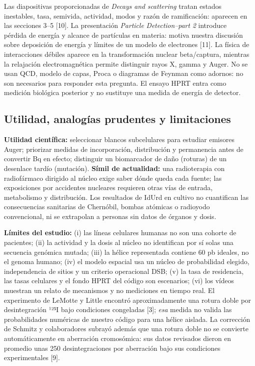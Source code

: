 \documentclass[11pt,a4paper,oneside]{article}
\begin{document}
Las diapositivas proporcionadas de \emph{Decays and scattering} tratan estados inestables, tasa, semivida, actividad, modos y razón de ramificación: aparecen en las secciones 3--5 {[}10{]}. La presentación \emph{Particle Detection--part 2} introduce pérdida de energía y alcance de partículas en materia: motiva nuestra discusión sobre deposición de energía y límites de un modelo de electrones {[}11{]}. La física de interacciones débiles aparece en la transformación nuclear beta/captura, mientras la relajación electromagnética permite distinguir rayos X, gamma y Auger. No se usan QCD, modelo de capas, Proca o diagramas de Feynman como adornos: no son necesarios para responder esta pregunta. El ensayo HPRT entra como medición biológica posterior y no sustituye una medida de energía de detector.

\subsection{Utilidad, analogías prudentes y limitaciones}\label{utilidad-analoguxedas-prudentes-y-limitaciones}

\textbf{Utilidad científica:} seleccionar blancos subcelulares para estudiar emisores Auger; priorizar medidas de incorporación, distribución y permanencia antes de convertir Bq en efecto; distinguir un biomarcador de daño (roturas) de un desenlace tardío (mutación). \textbf{Símil de actualidad:} una radioterapia con radiofármaco dirigido al núcleo exige saber dónde queda cada fuente; las exposiciones por accidentes nucleares requieren otras vías de entrada, metabolismo y distribución. Los resultados de IdUrd en cultivo no cuantifican las consecuencias sanitarias de Chernóbil, bombas atómicas o radioyodo convencional, ni se extrapolan a personas sin datos de órganos y dosis.

\textbf{Límites del estudio:} (i) las líneas celulares humanas no son una cohorte de pacientes; (ii) la actividad y la dosis al núcleo no identifican por sí solas una secuencia genómica mutada; (iii) la hélice representada contiene 60 pb ideales, no el genoma humano; (iv) el modelo espacial usa un núcleo de probabilidad elegido, independencia de sitios y un criterio operacional DSB; (v) la tasa de residencia, las tasas celulares y el fondo HPRT del código son escenarios; (vi) los vídeos muestran un relato de mecanismos y no mediciones en tiempo real. El experimento de LeMotte y Little encontró aproximadamente una rotura doble por desintegración ¹²⁵I bajo condiciones congeladas {[}3{]}; \emph{esa} medida no valida las probabilidades numéricas de nuestro código para una hélice aislada. La corrección de Schmitz y colaboradores subrayó además que una rotura doble no se convierte automáticamente en aberración cromosómica: sus datos revisados dieron en promedio unas 250 desintegraciones por aberración bajo sus condiciones experimentales {[}9{]}.
\end{document}

